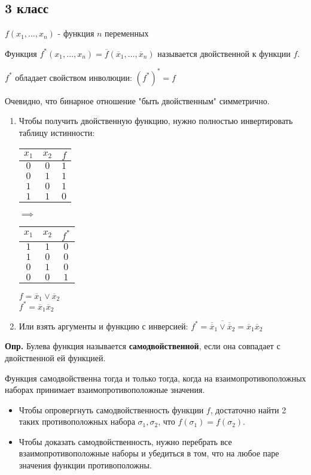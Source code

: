 \documentclass[10pt]{article}
\begin{document}
\subsection*{3 класс}
\par $f(x_1, \dots, x_n)$ - функция $n$ переменных
\par Функция $f^*(x_1, \dots, x_n) = \overline f(\overline x_1, \dots, \overline x_n)$ называется двойственной к функции $f$.
\par $f^*$ обладает свойством инволюции: $(f^*)^* = f$
\par Очевидно, что бинарное отношение "быть двойственным" симметрично.
\begin{enumerate}
    \item Чтобы получить двойственную функцию, нужно полностью инвертировать таблицу истинности:
        \begin{tabular}{|c|c|c|}
            \hline
            $x_1$ & $x_2$ & $f$ \\
            \hline
            $0$ & $0$ & $1$ \\
            $0$ & $1$ & $1$ \\
            $1$ & $0$ & $1$ \\
            $1$ & $1$ & $0$ \\
            \hline
        \end{tabular}
        \(\implies\)
        \begin{tabular}{|c|c|c|}
            \hline
            $x_1$ & $x_2$ & $f^*$ \\
            \hline
            $1$ & $1$ & $0$ \\
            $1$ & $0$ & $0$ \\
            $0$ & $1$ & $0$ \\
            $0$ & $0$ & $1$ \\
            \hline
        \end{tabular}
        \par $f = \overline x_1 \lor \overline x_2$ \\ $f^* = \overline x_1 \overline x_2$
    \item Или взять аргументы и функцию с инверсией: $f^* = \overline {\overline {\overline x}_1 \lor \overline {\overline x}_2} = \overline x_1 \overline x_2$
\end{enumerate}

\par\textbf{Опр.} Булева функция называется \textbf{самодвойственной}, если она совпадает с двойственной ей функцией.
\par Функция самодвойственна тогда и только тогда, когда на взаимопротивоположных наборах принимает взаимопротивоположные значения.
\begin{itemize}
    \item Чтобы опровергнуть самодвойственность функции $f$, достаточно найти 2 таких противоположных набора $\sigma_1, \sigma_2$, что $f(\sigma_1) = f(\sigma_2)$.
    \item Чтобы доказать самодвойственность, нужно перебрать все взаимопротивоположные наборы и убедиться в том, что на любое паре значения функции противоположны.
\end{itemize}
\end{document}
